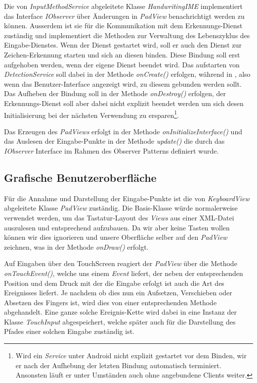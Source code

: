 Die von \emph{InputMethodService} abgeleitete Klasse \emph{HandwritingIME} implementiert das Interface \emph{IObserver} über Änderungen in \emph{PadView} benachrichtigt werden zu können. Ausserdem ist sie für die Kommunikation mit dem Erkennungs-Dienst zuständig und implementiert die Methoden zur Verwaltung des Lebenszyklus des Eingabe-Dienstes. Wenn der Dienst gestartet wird, soll er auch den Dienst zur Zeichen-Erkennung starten und sich an diesen binden. Diese Bindung soll erst aufgehoben werden, wenn der eigene Dienst beendet wird. Das aufstarten von \emph{DetectionService} soll dabei in der Methode \emph{onCreate()}  erfolgen, während in , also wenn das Benutzer-Interface angezeigt wird, zu diesem gebunden werden sollt. Das Aufheben der Bindung soll in der Methode \emph{onDestroy()} erfolgen, der Erkennungs-Dienst soll aber dabei nicht explizit beendet werden um sich desen Initialisierung bei der nächsten Verwendung zu ersparen\footnote{Wird ein \emph{Service} unter Android nicht explizit gestartet vor dem Binden, wir er nach der Aufhebung der letzten Bindung automatisch terminiert. Ansonsten läuft er unter Umständen auch ohne angebundene Clients weiter.}.

Das Erzeugen des \emph{PadViews} erfolgt in der Methode \emph{onInitializeInterface()} und das Auslesen der Eingabe-Punkte in der Methode \emph{update()} die durch das \emph{IObserver} Interface im Rahmen des Observer Patterns definiert wurde.

\subsection{Grafische Benutzeroberfläche}

Für die Annahme und Darstellung der Eingabe-Punkte ist die von \emph{KeyboardView} abgeleitete Klasse \emph{PadView} zuständig. Die Basis-Klasse würde normalerweise verwendet werden, um das Tastatur-Layout des \emph{Views} aus einer XML-Datei auszulesen und entsprechend aufzubauen. Da wir aber keine Tasten wollen können wir dies ignorieren und unsere Oberfläche selber auf den \emph{PadView} zeichnen, was in der Methode \emph{onDraw()} erfolgt.

Auf Eingaben über den TouchScreen reagiert der \emph{PadView} über die Methode \emph{onTouchEvent()}, welche uns einem \emph{Event} liefert, der neben der entsprechenden Position und dem Druck mit der die Eingabe erfolgt ist auch die Art des Ereignisses liefert. Je nachdem ob dies nun ein Aufsetzen, Verschieben oder Absetzen des Fingers ist, wird dies von einer entsprechenden Methode abgehandelt. Eine ganze solche Ereignis-Kette wird dabei in eine Instanz der Klasse \emph{TouchInput} abgespeichert, welche später auch für die Darstellung des Pfades einer solchen Eingabe zuständig ist.

